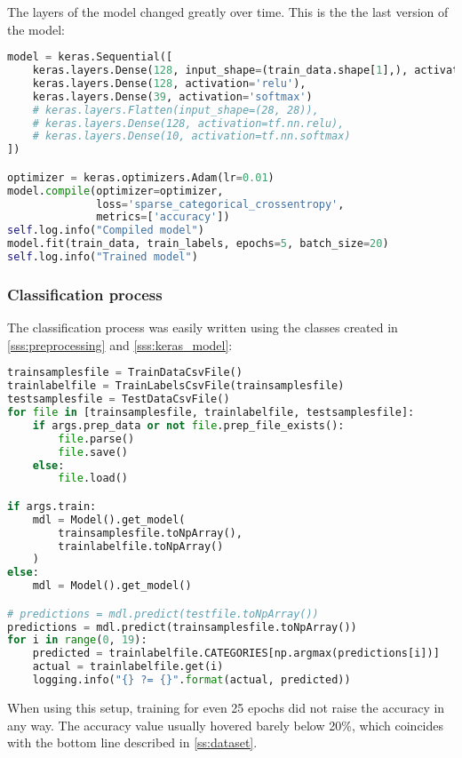 \documentclass[titlepage,12pt]{article}
\begin{document}
The layers of the model changed greatly over time. This is the the last version of the model:

\begin{lstlisting}[language=python,label=lst:keras_model,caption={Keras model}]
model = keras.Sequential([
    keras.layers.Dense(128, input_shape=(train_data.shape[1],), activation='relu'),
    keras.layers.Dense(128, activation='relu'),
    keras.layers.Dense(39, activation='softmax')
    # keras.layers.Flatten(input_shape=(28, 28)),
    # keras.layers.Dense(128, activation=tf.nn.relu),
    # keras.layers.Dense(10, activation=tf.nn.softmax)
])

optimizer = keras.optimizers.Adam(lr=0.01)
model.compile(optimizer=optimizer,
              loss='sparse_categorical_crossentropy',
              metrics=['accuracy'])
self.log.info("Compiled model")
model.fit(train_data, train_labels, epochs=5, batch_size=20)
self.log.info("Trained model")
\end{lstlisting}

\subsubsection{Classification process}\label{sss:classification_process}
The classification process was easily written using the classes created in \ref{sss:preprocessing} and \ref{sss:keras_model}:

\begin{lstlisting}[language=python,label=lst:main_py,caption={main.py}]
trainsamplesfile = TrainDataCsvFile()
trainlabelfile = TrainLabelsCsvFile(trainsamplesfile)
testsamplesfile = TestDataCsvFile()
for file in [trainsamplesfile, trainlabelfile, testsamplesfile]:
    if args.prep_data or not file.prep_file_exists():
        file.parse()
        file.save()
    else:
        file.load()

if args.train:
    mdl = Model().get_model(
        trainsamplesfile.toNpArray(),
        trainlabelfile.toNpArray()
    )
else:
    mdl = Model().get_model()

# predictions = mdl.predict(testfile.toNpArray())
predictions = mdl.predict(trainsamplesfile.toNpArray())
for i in range(0, 19):
    predicted = trainlabelfile.CATEGORIES[np.argmax(predictions[i])]
    actual = trainlabelfile.get(i)
    logging.info("{} ?= {}".format(actual, predicted))
\end{lstlisting}

When using this setup, training for even 25 epochs did not raise the accuracy in any way. The accuracy value usually hovered barely below 20\%, which coincides with the bottom line described in \ref{ss:dataset}.
\end{document}
